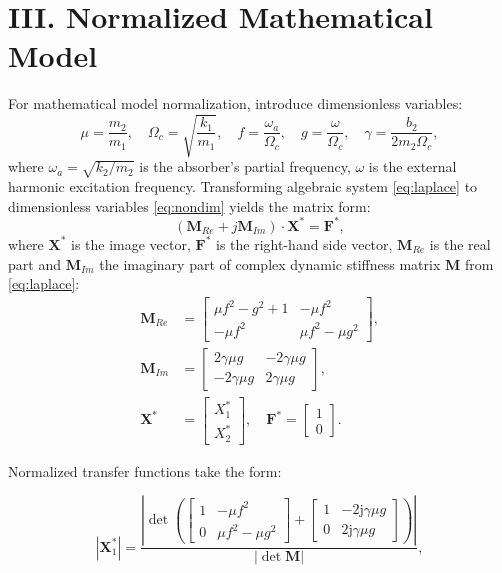 \documentclass[12pt, a4paper]{article}
\begin{document}
	\section*{III. Normalized Mathematical Model}
	For mathematical model normalization, introduce dimensionless variables:
	\begin{equation}
		\mu = \frac{m_2}{m_1},\quad
		\Omega_c = \sqrt{\frac{k_1}{m_1}},\quad
		f = \frac{\omega_a}{\Omega_c},\quad
		g = \frac{\omega}{\Omega_c},\quad
		\gamma = \frac{b_2}{2 m_2 \Omega_c},
		\label{eq:nondim}
	\end{equation}
	where $\omega_a = \sqrt{k_2/m_2}$ is the absorber's partial frequency, $\omega$ is the external harmonic excitation frequency. Transforming algebraic system \eqref{eq:laplace} to dimensionless variables \eqref{eq:nondim} yields the matrix form:
	\begin{equation}
		(\mathbf{M}_{Re} + j \mathbf{M}_{Im}) \cdot \mathbf{X}^* = \mathbf{F}^*,
		\label{eq:matrix}
	\end{equation}
	where $\mathbf{X}^{*}$ is the image vector, $\mathbf{F}^{*}$ is the right-hand side vector, $\mathbf{M}_{Re}$ is the real part and $\mathbf{M}_{Im}$ the imaginary part of complex dynamic stiffness matrix $\mathbf{M}$ from \eqref{eq:laplace}:
	\begin{align}
		\mathbf{M}_{Re} &= 
		\begin{bmatrix}
			\mu f^2 - g^2 + 1 & -\mu f^2 \\
			-\mu f^2 & \mu f^2 - \mu g^2
		\end{bmatrix},
		\label{eq:MR} \\
		\mathbf{M}_{Im} &= 
		\begin{bmatrix}
			2\gamma\mu g & -2\gamma\mu g \\
			-2\gamma\mu g & 2\gamma\mu g
		\end{bmatrix},
		\label{eq:MI} \\
		\mathbf{X}^{*} &= 
		\begin{bmatrix}
			X^{*}_1 \\
			X^{*}_2
		\end{bmatrix},\quad
		\mathbf{F}^{*} = 
		\begin{bmatrix}
			1 \\
			0
		\end{bmatrix}.
	\end{align}
	
	Normalized transfer functions take the form:
	
	\begin{equation}
		|\mathbf{X}^{*}_{1}| = \frac{\left|\det\left(
			\begin{bmatrix}
				1 & -\mu f^{2} \\
				0 & \mu f^{2} - \mu g^{2}
			\end{bmatrix}
			+
			\begin{bmatrix}
				1 & -2\mathrm{j}\gamma\mu g \\
				0 & 2\mathrm{j}\gamma\mu g
			\end{bmatrix}
			\right)\right|}{|\det\mathbf{M}|},
	\end{equation}
	
\end{document}
